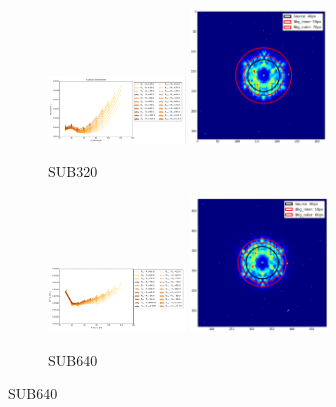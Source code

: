\documentclass{aastex6}
\begin{document}
        \begin{figure}[H]
            \centering
            \begin{subfigure}{1}
                \includegraphics[width = 0.4\textwidth]{Combo}
                \includegraphics[width = 0.4\textwidth]{sub320_rings}
                \caption{SUB320}
            \end{subfigure}
        
            \begin{subfigure}{2}
                \includegraphics[width = 0.4\textwidth]{Radius_640}
                \includegraphics[width = 0.4\textwidth]{sub640_rings}
                \caption{SUB640}
            \end{subfigure}
            

\end{figure}
\end{document}
